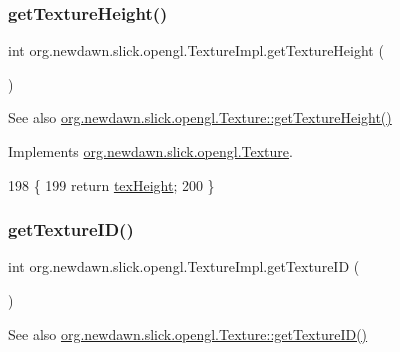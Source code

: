 \subsubsection{\texorpdfstring{get\+Texture\+Height()}{getTextureHeight()}}
{\footnotesize\ttfamily int org.\+newdawn.\+slick.\+opengl.\+Texture\+Impl.\+get\+Texture\+Height (\begin{DoxyParamCaption}{ }\end{DoxyParamCaption})\hspace{0.3cm}{\ttfamily [inline]}}

\begin{DoxySeeAlso}{See also}
\mbox{\hyperlink{interfaceorg_1_1newdawn_1_1slick_1_1opengl_1_1_texture_a6626d0905e80214b320fb0042ad0e98d}{org.\+newdawn.\+slick.\+opengl.\+Texture\+::get\+Texture\+Height()}} 
\end{DoxySeeAlso}


Implements \mbox{\hyperlink{interfaceorg_1_1newdawn_1_1slick_1_1opengl_1_1_texture_a6626d0905e80214b320fb0042ad0e98d}{org.\+newdawn.\+slick.\+opengl.\+Texture}}.


\begin{DoxyCode}
198                                   \{
199         \textcolor{keywordflow}{return} \mbox{\hyperlink{classorg_1_1newdawn_1_1slick_1_1opengl_1_1_texture_impl_afa18dcc63658ee42ca8f6a2822f18c1d}{texHeight}};
200     \}
\end{DoxyCode}
\mbox{\label{classorg_1_1newdawn_1_1slick_1_1opengl_1_1_texture_impl_a5f9635744122138ab81a37fe44a8bcdc}} 
\subsubsection{\texorpdfstring{get\+Texture\+I\+D()}{getTextureID()}}
{\footnotesize\ttfamily int org.\+newdawn.\+slick.\+opengl.\+Texture\+Impl.\+get\+Texture\+ID (\begin{DoxyParamCaption}{ }\end{DoxyParamCaption})\hspace{0.3cm}{\ttfamily [inline]}}

\begin{DoxySeeAlso}{See also}
\mbox{\hyperlink{interfaceorg_1_1newdawn_1_1slick_1_1opengl_1_1_texture_a0d846c1cfcc66768db002d4eb06ad841}{org.\+newdawn.\+slick.\+opengl.\+Texture\+::get\+Texture\+I\+D()}} 
\end{DoxySeeAlso}


